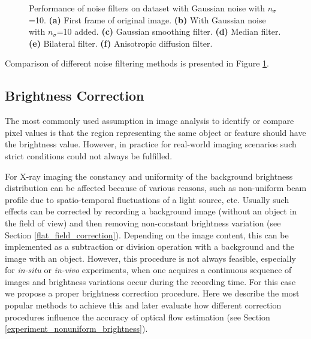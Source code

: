 \begin{figure}[!ht]
  \centerline{
    \mbox{}
    \mbox{}
  }
  \vspace{3pt}
  \centerline{
    \mbox{}
    \mbox{}
  }
  \vspace{3pt}
  \centerline{
    \mbox{}
    \mbox{}
  }
  \caption[Noise filterst]{Performance of noise filters on \rub dataset with Gaussian noise with $n_{\sigma}$=10. \textbf{(a)} First frame of original image. \textbf{(b)} With Gaussian noise with $n_{\sigma}$=10 added.  \textbf{(c)} Gaussian smoothing filter. \textbf{(d)} Median filter. \textbf{(e)} Bilateral filter. \textbf{(f)} Anisotropic diffusion filter.}
  \label{fig:noise_filters}
\end{figure}
\vspace{7pt}

\noindent Comparison of different noise filtering methods is presented in Figure \ref{fig:noise_filters}.

                 
\subsection{Brightness Correction}
\label{brightness_correction}


The most commonly used assumption in image analysis to identify or compare pixel values is that the region representing the same object or feature should have the brightness value. However, in practice for real-world imaging scenarios such strict conditions could not always be fulfilled. 

For X-ray imaging the constancy and uniformity of the background brightness distribution can be affected because of various reasons, such as non-uniform beam profile due to spatio-temporal fluctuations of a light source, etc.  
Usually such effects can be corrected by recording a background image (without an object in the field of view) and then removing non-constant brightness variation (see Section \ref{flat_field_correction}). Depending on the image content, this can be implemented as a subtraction or division operation with a background and the image with an object. However, this procedure is not always feasible, especially for \textit{in-situ} or \textit{in-vivo} experiments, when one acquires a continuous sequence of images and brightness variations occur during the recording time. For this case we propose a proper brightness correction procedure. Here we describe the most popular methods to achieve this and later evaluate how different correction procedures influence the accuracy of optical flow estimation (see Section \ref{experiment_nonuniform_brightness}).          


